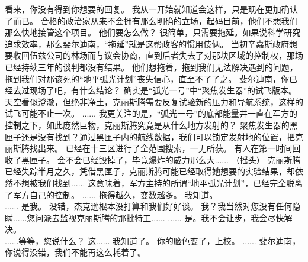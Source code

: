 \documentclass[openany]{book}
\begin{document}
\begin{dialogue}
     看来，你没有得到你想要的回复。
     我从一开始就知道会这样，只是现在更加确认了而已。
     合格的政治家从来不会拥有那么明确的立场，起码目前，他们不想我们那么快地接管这个项目。
     他们要怎么做？
     很简单，只需要拖延。如果说科学研究追求效率，那么斐尔迪南，“拖延”就是这帮政客的惯用伎俩。
     当初辛嘉斯政府想要收回伍兹公司的林场而与议会协商，直到后者失去了对那块区域的控制权，那场已经持续三年的谈判都没有结果。
     他们想拖着，拖到我们无法解决遇到的问题，拖到我们对那该死的“地平弧光计划”丧失信心，直至不了了之。
     斐尔迪南，你已经去过现场了吧，有什么结论？
     确实是“弧光一号”中“聚焦发生器”的试飞版本。
     天空看似澄澈，但绝非净土，克丽斯腾需要反复试验新的压力和导航系统，这样的试飞可能不止一次。
     ......
     我更关注的是，“弧光一号”的底部能量井一直在军方的控制之下，如此庞然巨物，克丽斯腾究竟是从什么地方发射的？
     聚焦发生器的黑匣子还是没有找到？通过黑匣子内的航线数据，我们可以锁定发射地的位置，把克丽斯腾找出来。
     已经在十三区进行了全范围搜索，一无所获。
     有人在第一时间回收了黑匣子。
     会不会已经毁掉了，毕竟爆炸的威力那么大......
     （摇头）
     克丽斯腾已经失踪半月之久，凭借黑匣子，克丽斯腾可能已经取得她想要的实验结果，却依然不想被我们找到......
     这意味着，军方主持的所谓“地平弧光计划”，已经完全脱离了军方自己的控制。
     ......
     拖得越久，变数越多。
     我知道。
    \\
     ......
     是我。
     没错，杰克逊根本没打算和我们好好谈。
     我？我当然对您没有任何隐瞒......您问派去监视克丽斯腾的那批特工......
     ......
     是。我不会让步，我会尽快解决。
    \\
     ......等等，您说什么？
     这......
     我知道了。
     你的脸色变了，上校。
     ......
     斐尔迪南，你说得没错，我们不能再这么耗着了。
\end{dialogue}
\end{document}
